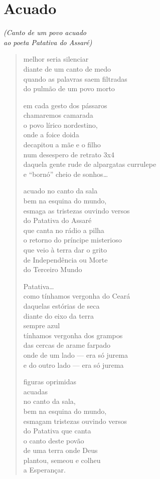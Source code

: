 \chapter{Acuado}

\begin{flushright}
\emph{(Canto de um povo acuado}\\
\emph{ao poeta Patativa do Assaré)}
\end{flushright}

\begin{verse}
melhor seria silenciar\\
diante de um canto de medo\\
quando as palavras saem filtradas\\
do pulmão de um povo morto

em cada gesto dos pássaros\\
chamaremos camarada\\
o povo lírico nordestino,\\
onde a foice doida\\
decapitou a mãe e o filho\\
num desespero de retrato 3x4\\
daquela gente rude de alpargatas currulepe\\
e ``bornó'' cheio de sonhos\ldots{}

acuado no canto da sala\\
bem na esquina do mundo,\\
esmaga as tristezas ouvindo versos\\
do Patativa do Assaré\\
que canta no rádio a pilha\\
o retorno do príncipe misterioso\\
que veio à terra dar o grito\\
de Independência ou Morte\\
do Terceiro Mundo

Patativa\ldots{}\\
como tínhamos vergonha do Ceará\\
daquelas estórias de seca\\
diante do eixo da terra\\
sempre azul\\
tínhamos vergonha dos grampos\\
das cercas de arame farpado\\
onde de um lado --- era só jurema\\
e do outro lado --- era só jurema

figuras oprimidas\\
acuadas\\
no canto da sala,\\
bem na esquina do mundo,\\
esmagam tristezas ouvindo versos\\
do Patativa que canta\\
o canto deste povão\\
de uma terra onde Deus\\
plantou, semeou e colheu\\
a Esperançar.
\end{verse}


